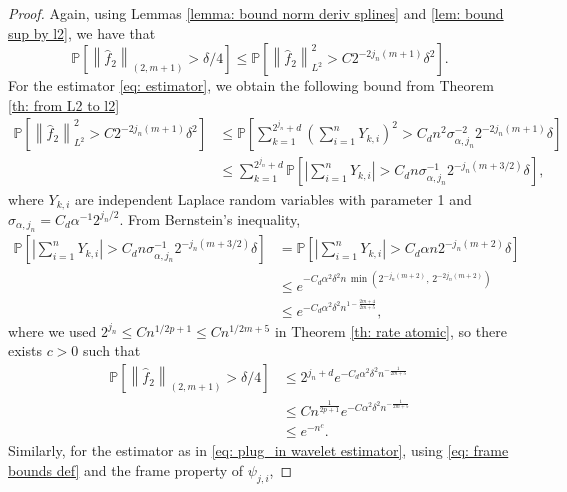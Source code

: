 \documentclass[preprint]{imsart}
\newcommand\norm[1]{\left\lVert#1\right\rVert}
\numberwithin{equation}{section}
\begin{document}
\begin{appendix}
\begin{proof}
Again, using Lemmas \ref{lemma: bound norm deriv splines} and \ref{lem: bound sup by l2}, we have that 
\[\mathbb{P}\left[\norm{\hat{f}_2}_{(2,m+1)}> \delta/4\right]\leq \mathbb{P}\left[\norm{\hat{f}_2}_{L^2}^2> C2^{-2j_n(m+1)}\delta^2\right].\]
For the estimator \eqref{eq: estimator}, we obtain the following bound from Theorem \ref{th: from L2 to l2}
\begin{align*}
\mathbb{P}\left[\norm{\hat{f}_2}_{L^2}^2> C2^{-2j_n(m+1)}\delta^2\right]&\leq \mathbb{P}\left[\sum_{k=1}^{2^{j_n}+d}\left(\sum_{i=1}^n Y_{k,i}\right)^2> C_dn^2 \sigma_{\alpha,j_n}^{-2}2^{-2j_n(m+1)}\delta\right]\\
&\leq \sum_{k=1}^{2^{j_n}+d}\mathbb{P}\left[\left|\sum_{i=1}^n Y_{k,i}\right|>C_dn \sigma_{\alpha,j_n}^{-1}2^{-j_n(m+3/2)}\delta\right],
\end{align*}
where $Y_{k,i}$ are independent Laplace random variables with parameter 1 and $\sigma_{\alpha,j_n}=C_d\alpha^{-1}2^{j_n/2}$. From Bernstein's inequality,
\begin{align*}
\mathbb{P}\left[\left|\sum_{i=1}^n Y_{k,i}\right|>C_dn \sigma_{\alpha,j_n}^{-1}2^{-j_n(m+3/2)}\delta\right]&=\mathbb{P}\left[\left|\sum_{i=1}^n Y_{k,i}\right|>C_d\alpha n 2^{-j_n(m+2)}\delta\right]\\
&\leq e^{-C_d\alpha^2 \delta^2 n\, \min\left(2^{-j_n(m+2)},\, 2^{-2j_n(m+2)}\right)}\\
&\leq e^{-C_d\alpha^2 \delta^2 n^{1-\frac{2m+4}{2m+5}}},
\end{align*}
where we used $2^{j_n}\leq C n^{1/{2p+1}}\leq C n^{1/{2m+5}}$ in Theorem \ref{th: rate atomic}, so there exists $c>0$ such that
\begin{align}
    \mathbb{P}\left[\norm{\hat{f}_2}_{(2,m+1)}> \delta/4\right]&\leq 2^{j_n+d}e^{-C_d\alpha^2 \delta^2 n^{-\frac{1}{2m+5}}}\nonumber\\
    &\leq Cn^{\frac{1}{2p+1}}e^{-C\alpha^2 \delta^2 n^{-\frac{1}{2m+5}}}\nonumber\\
    &\leq e^{-n^c}.\label{eq: bound deviation lap Bsp}
\end{align}
Similarly, for the estimator as in \eqref{eq: plug_in wavelet estimator}, using \eqref{eq: frame bounds def} and the frame property of $\psi_{j,i}$,

\end{proof}
\end{appendix}
\end{document}
